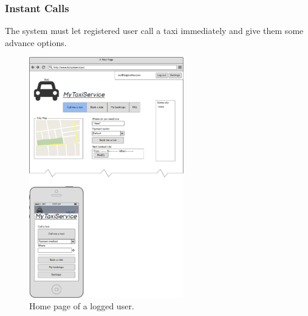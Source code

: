 		\subsubsection {Instant Calls}
			The system must let registered user call a taxi immediately and give them some advance options.
			\begin{figure}[h!]
				\includegraphics[width=0.6\textwidth]{mockup/homelog}
				\caption{Home page of a logged user.}
			\end{figure}
			\FloatBarrier
			\newpage
